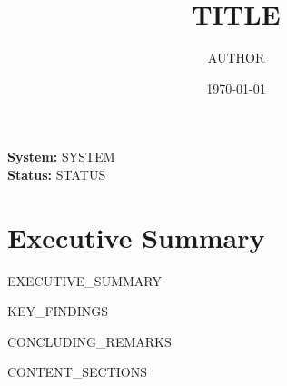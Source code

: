 \documentclass[11pt, a4paper]{article}
\title{\textbf{{{TITLE}}}}
\author{{{AUTHOR}}}
\date{\today}
\begin{document}
\maketitle

\begin{center}
    \textbf{System:} {{SYSTEM}} \\
    \textbf{Status:} {{STATUS}}
\end{center}

\hrulefill

\section*{Executive Summary}

{{EXECUTIVE_SUMMARY}}

{{KEY_FINDINGS}}

{{CONCLUDING_REMARKS}}

\hrulefill
\vspace{1cm}

{{CONTENT_SECTIONS}}
\end{document}
